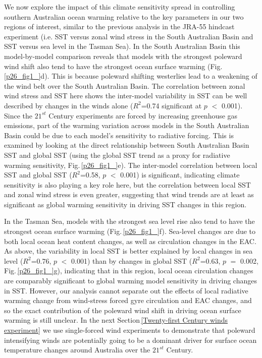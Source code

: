 \documentclass[draft,linenumbers]{agujournal2018}
\begin{document}
We now explore the impact of this climate sensitivity spread in controlling southern Australian ocean warming relative to the key parameters in our two regions of interest, similar to the previous analysis in the JRA-55 hindcast experiment (i.e. SST versus zonal wind stress in the South Australian Basin and SST versus sea level in the Tasman Sea). In the South Australian Basin this model-by-model comparison reveals that models with the strongest poleward wind shift also tend to have the strongest ocean surface warming (Fig.\,\ref{p26_fig1_}d). This is because poleward shifting westerlies lead to a weakening of the wind belt over the South Australian Basin. The correlation between zonal wind stress and SST here shows the inter-model variability in SST can be well described by changes in the winds alone ($R^2$=0.74 significant at $p$ $<$ 0.001). Since the $21^{st}$ Century experiments are forced by increasing greenhouse gas emissions, part of the warming variation across models in the South Australian Basin could be due to each model's sensitivity to radiative forcing. This is examined by looking at the direct relationship between South Australian Basin SST and global SST (using the global SST trend as a proxy for radiative warming sensitivity, Fig.\,\ref{p26_fig1_}e). The inter-model correlation between local SST and global SST ($R^2$=0.58, $p$ $<$ 0.001) is significant, indicating climate sensitivity is also playing a key role here, but the correlation between local SST and zonal wind stress is even greater, suggesting that wind trends are at least as significant as global warming sensitivity in driving SST changes in this region.

In the Tasman Sea, models with the strongest sea level rise also tend to have the strongest ocean surface warming (Fig.\,\ref{p26_fig1_}f). Sea-level changes are due to both local ocean heat content changes, as well as circulation changes in the EAC. As above, the variability in local SST is better explained by local changes in sea level ($R^2$=0.76, $p$ $<$ 0.001) than by changes in global SST ($R^2$=0.63, $p$ $=$ 0.002, Fig.\,\ref{p26_fig1_}g), indicating that in this region, local ocean circulation changes are comparably significant to global warming model sensitivity in driving changes in SST. However, our analysis cannot separate out the effects of local radiative warming change from wind-stress forced gyre circulation and EAC changes, and so the exact contribution of the poleward wind shift in driving ocean surface warming is still unclear. In the next Section\,\ref{Twenty-first Century winds experiment} we use single-forced wind experiments to demonstrate that poleward intensifying winds are potentially going to be a dominant driver for surface ocean temperature changes around Australia over the $21^{st}$ Century.
\end{document}
